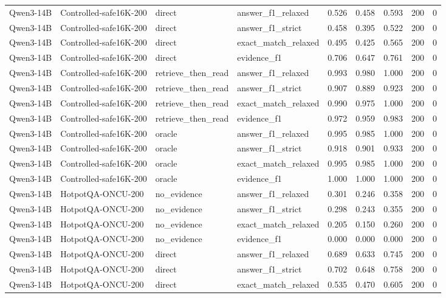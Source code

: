 \begin{tabular}{llllrrrrr}
Qwen3-14B & Controlled-safe16K-200 & direct & answer_f1_relaxed & 0.526 & 0.458 & 0.593 & 200 & 0 \\
Qwen3-14B & Controlled-safe16K-200 & direct & answer_f1_strict & 0.458 & 0.395 & 0.522 & 200 & 0 \\
Qwen3-14B & Controlled-safe16K-200 & direct & exact_match_relaxed & 0.495 & 0.425 & 0.565 & 200 & 0 \\
Qwen3-14B & Controlled-safe16K-200 & direct & evidence_f1 & 0.706 & 0.647 & 0.761 & 200 & 0 \\
Qwen3-14B & Controlled-safe16K-200 & retrieve_then_read & answer_f1_relaxed & 0.993 & 0.980 & 1.000 & 200 & 0 \\
Qwen3-14B & Controlled-safe16K-200 & retrieve_then_read & answer_f1_strict & 0.907 & 0.889 & 0.923 & 200 & 0 \\
Qwen3-14B & Controlled-safe16K-200 & retrieve_then_read & exact_match_relaxed & 0.990 & 0.975 & 1.000 & 200 & 0 \\
Qwen3-14B & Controlled-safe16K-200 & retrieve_then_read & evidence_f1 & 0.972 & 0.959 & 0.983 & 200 & 0 \\
Qwen3-14B & Controlled-safe16K-200 & oracle & answer_f1_relaxed & 0.995 & 0.985 & 1.000 & 200 & 0 \\
Qwen3-14B & Controlled-safe16K-200 & oracle & answer_f1_strict & 0.918 & 0.901 & 0.933 & 200 & 0 \\
Qwen3-14B & Controlled-safe16K-200 & oracle & exact_match_relaxed & 0.995 & 0.985 & 1.000 & 200 & 0 \\
Qwen3-14B & Controlled-safe16K-200 & oracle & evidence_f1 & 1.000 & 1.000 & 1.000 & 200 & 0 \\
Qwen3-14B & HotpotQA-ONCU-200 & no_evidence & answer_f1_relaxed & 0.301 & 0.246 & 0.358 & 200 & 0 \\
Qwen3-14B & HotpotQA-ONCU-200 & no_evidence & answer_f1_strict & 0.298 & 0.243 & 0.355 & 200 & 0 \\
Qwen3-14B & HotpotQA-ONCU-200 & no_evidence & exact_match_relaxed & 0.205 & 0.150 & 0.260 & 200 & 0 \\
Qwen3-14B & HotpotQA-ONCU-200 & no_evidence & evidence_f1 & 0.000 & 0.000 & 0.000 & 200 & 0 \\
Qwen3-14B & HotpotQA-ONCU-200 & direct & answer_f1_relaxed & 0.689 & 0.633 & 0.745 & 200 & 0 \\
Qwen3-14B & HotpotQA-ONCU-200 & direct & answer_f1_strict & 0.702 & 0.648 & 0.758 & 200 & 0 \\
Qwen3-14B & HotpotQA-ONCU-200 & direct & exact_match_relaxed & 0.535 & 0.470 & 0.605 & 200 & 0 \\

\end{tabular}
